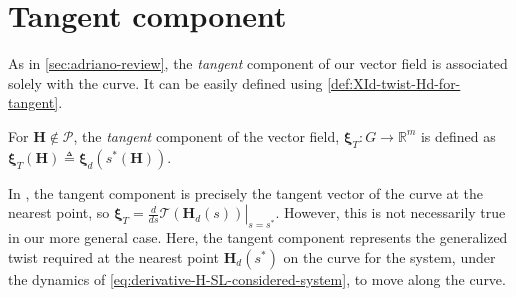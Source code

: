 \section{Tangent component}
As in \cref{sec:adriano-review}, the \emph{tangent} component of our vector field is associated solely with the curve. It can be easily defined using \cref{def:XId-twist-Hd-for-tangent}.
\begin{definition} \label{def:tangent-vector}
     For $\mathbf{H} \not \in \mathcal{P}$, the \emph{tangent} component of the vector field, $\boldsymbol{\xi}_T:G\to\mathbb{R}^m$ is defined as $\boldsymbol{\xi}_T(\mathbf{H})\triangleq\boldsymbol{\xi}_d(s^*(\mathbf{H}))$. 
\end{definition}

\begin{example}
    In \citet{Rezende2022}, the tangent component is precisely the tangent vector of the curve at the nearest point, so $\boldsymbol{\xi}_{T}=\left.\frac{d}{ds}\mathcal{T}(\mathbf{H}_d(s))\right|_{s=s^*}$. However, this is not necessarily true in our more general case. Here, the tangent component represents the generalized twist required at the nearest point $\mathbf{H}_d(s^*)$ on the curve for the system, under the dynamics of \eqref{eq:derivative-H-SL-considered-system}, to move along the curve.
    
\end{example}
